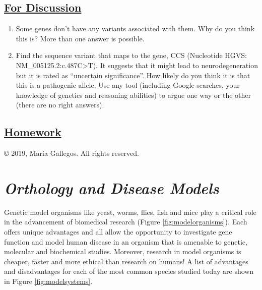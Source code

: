 \documentclass[
]{book}
\providecommand{\tightlist}{%
  \setlength{\itemsep}{0pt}\setlength{\parskip}{0pt}}
\begin{document}
\hypertarget{for-discussion-4}{%
\section{\texorpdfstring{\href{https://docs.google.com/forms/d/e/1FAIpQLSda-6Xh3SbF8zzKhoQVZ6biWLkzigculLabj8y3Jg1I4Yc5KA/viewform?usp=sf_link}{For Discussion}}{For Discussion}}\label{for-discussion-4}}

\begin{enumerate}
\def\labelenumi{\arabic{enumi}.}
\tightlist
\item
  Some genes don't have any variants associated with them. Why do you think this is? More than one answer is possible.
\item
  Find the sequence variant that maps to the gene, CCS (Nucleotide HGVS: NM\_005125.2:c.487C\textgreater T). It suggests that it might lead to neurodegeneration but it is rated as ``uncertain significance''. How likely do you think it is that this is a pathogenic allele. Use any tool (including Google searches, your knowledge of genetics and reasoning abilities) to argue one way or the other (there are no right answers).
\end{enumerate}

\hypertarget{homework-1}{%
\section{\texorpdfstring{\href{https://drive.google.com/file/d/11T71xL2ylto_hP32Uo560bUnb0kbLp61/view?usp=sharing}{Homework}}{Homework}}\label{homework-1}}

© 2019, Maria Gallegos. All rights reserved.

\hypertarget{orthology-and-disease-models}{%
\chapter{\texorpdfstring{\emph{Orthology and Disease Models}}{Orthology and Disease Models}}\label{orthology-and-disease-models}}

Genetic model organisms like yeast, worms, flies, fish and mice play a critical role in the advancement of biomedical research (Figure \ref{fig:modelorganisms}). Each offers unique advantages and all allow the opportunity to investigate gene function and model human disease in an organism that is amenable to genetic, molecular and biochemical studies. Moreover, research in model organisms is cheaper, faster and more ethical than research on humans! A list of advantages and disadvantages for each of the most common species studied today are shown in Figure \ref{fig:modelsystems}.
\end{document}
